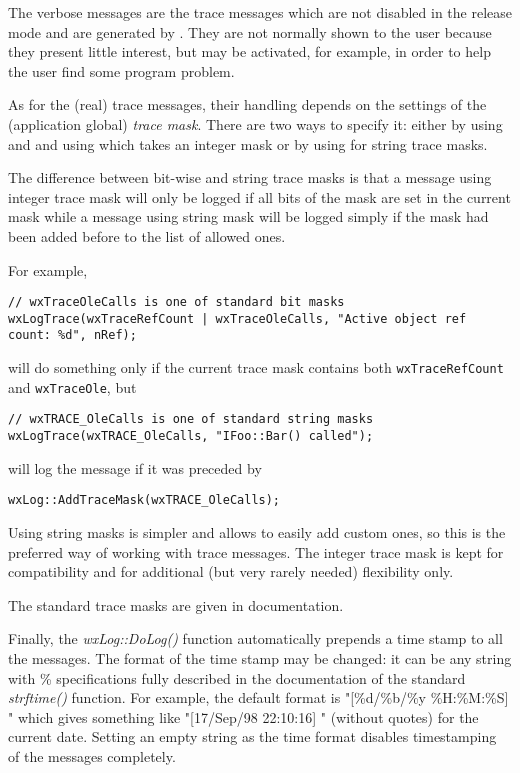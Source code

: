 The verbose messages are the trace messages which are not disabled in the
release mode and are generated by . They
are not normally shown to the user because they present little interest, but
may be activated, for example, in order to help the user find some program
problem.

As for the (real) trace messages, their handling depends on the settings of
the (application global) {\it trace mask}. There are two ways to specify it:
either by using  and
 and using
 which takes an integer mask or by using
 for string trace masks.

The difference between bit-wise and string trace masks is that a message using
integer trace mask will only be logged if all bits of the mask are set in the
current mask while a message using string mask will be logged simply if the
mask had been added before to the list of allowed ones.

For example,

\begin{verbatim}
// wxTraceOleCalls is one of standard bit masks
wxLogTrace(wxTraceRefCount | wxTraceOleCalls, "Active object ref count: %d", nRef);
\end{verbatim}
will do something only if the current trace mask contains both
{\tt wxTraceRefCount} and {\tt wxTraceOle}, but

\begin{verbatim}
// wxTRACE_OleCalls is one of standard string masks
wxLogTrace(wxTRACE_OleCalls, "IFoo::Bar() called");
\end{verbatim}

will log the message if it was preceded by

\begin{verbatim}
wxLog::AddTraceMask(wxTRACE_OleCalls);
\end{verbatim}

Using string masks is simpler and allows to easily add custom ones, so this is
the preferred way of working with trace messages. The integer trace mask is
kept for compatibility and for additional (but very rarely needed) flexibility
only.

The standard trace masks are given in 
documentation.

Finally, the {\it wxLog::DoLog()} function automatically prepends a time stamp
to all the messages. The format of the time stamp may be changed: it can be
any string with \% specifications fully described in the documentation of the
standard {\it strftime()} function. For example, the default format is
"[\%d/\%b/\%y \%H:\%M:\%S] " which gives something like "[17/Sep/98 22:10:16] "
(without quotes) for the current date. Setting an empty string as the time
format disables timestamping of the messages completely.

